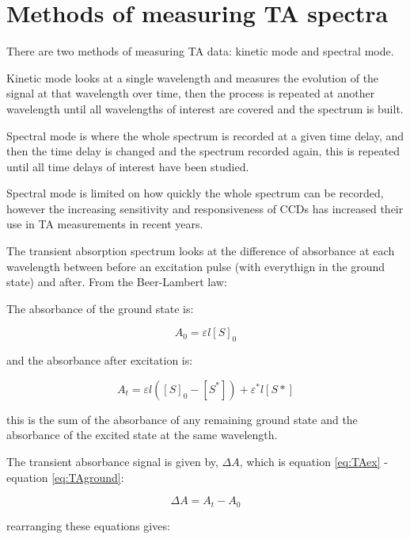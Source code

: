 \documentclass[
]{book}
\begin{document}
\hypertarget{methods-of-measuring-ta-spectra}{%
\section{Methods of measuring TA spectra}\label{methods-of-measuring-ta-spectra}}

There are two methods of measuring TA data: kinetic mode and spectral mode.

Kinetic mode looks at a single wavelength and measures the evolution of the signal at that wavelength over time, then the process is repeated at another wavelength until all wavelengths of interest are covered and the spectrum is built.

Spectral mode is where the whole spectrum is recorded at a given time delay, and then the time delay is changed and the spectrum recorded again, this is repeated until all time delays of interest have been studied.

Spectral mode is limited on how quickly the whole spectrum can be recorded, however the increasing sensitivity and responsiveness of CCDs has increased their use in TA measurements in recent years.

The transient absorption spectrum looks at the difference of absorbance at each wavelength between before an excitation pulse (with everythign in the ground state) and after. From the Beer-Lambert law:

The absorbance of the ground state is:

\begin{equation}
A_0=\varepsilon l [S]_0
\label{eq:TAground}
\end{equation}

and the absorbance after excitation is:

\begin{equation}
A_t=\varepsilon l ([S]_0-[S^*]) + \varepsilon^*l[S*]
\label{eq:TAex}
\end{equation}

this is the sum of the absorbance of any remaining ground state and the absorbance of the excited state at the same wavelength.

The transient absorbance signal is given by, \(\Delta A\), which is equation \eqref{eq:TAex} - equation \eqref{eq:TAground}:

\begin{equation}
\Delta A = A_t-A_0
\label{eq:TA}
\end{equation}

rearranging these equations gives:
\end{document}
